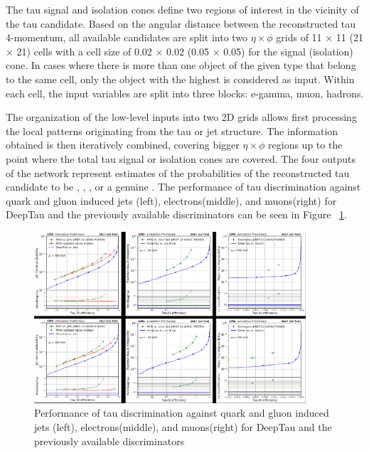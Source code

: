 The tau signal and isolation cones define two regions of interest in the vicinity of the tau candidate. Based on the angular distance between the reconstructed tau 4-momentum, all available candidates are split into two $\eta \times \phi$ grids of 11 $\times$ 11 (21 $\times$ 21) cells with a cell size of 0.02 $\times$ 0.02 (0.05 $\times$ 0.05) for the signal (isolation) cone. In cases where there is more than one object of the given type that belong to the same cell, only the object with the highest \pt is considered as input. Within each cell, the input variables are split into three blocks: e-gamma, muon, hadrons.

The organization of the low-level inputs into two 2D grids allows first processing the local patterns originating from the tau or jet structure. The information obtained is then iteratively combined, covering bigger $\eta \times \phi$ regions up to the point where the total tau signal or isolation cones are covered. The four outputs of the network represent estimates of the probabilities of the reconstructed tau candidate to be \taue, \taum, \tauj, or a genuine \tauh. The performance of tau discrimination against quark and gluon induced jets (left), electrons(middle), and muons(right) for DeepTau and the previously available discriminators can be seen in Figure ~\ref{fig:deeptau}.

\begin{figure}[hbtp]
  \centering
  \includegraphics[width=0.9\textwidth]{plots/chapter5/deeptau.png}
  \caption{Performance of tau discrimination against quark and gluon induced jets (left), electrons(middle), and muons(right) for DeepTau and the previously available discriminators}
  \label{fig:deeptau}
\end{figure}

